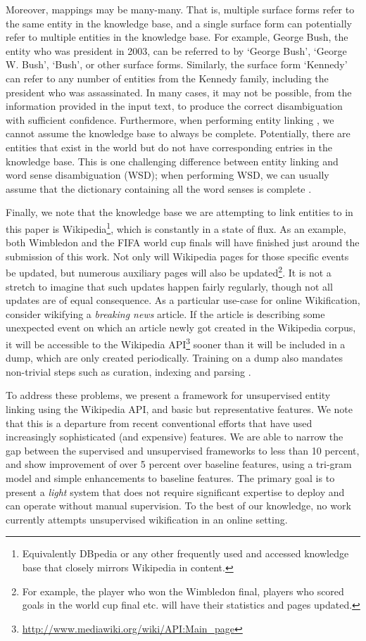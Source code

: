 \documentclass[runningheads,a4paper]{llncs}
\begin{document}
Moreover, mappings may be many-many. 
That is, multiple surface forms refer to the same entity in the knowledge base, and a single
surface form can potentially refer to multiple entities in the knowledge base. For example,
George Bush, the entity who was president in 2003, can be referred to by `George Bush',
`George W. Bush', `Bush', or other surface forms. Similarly, the surface 
form `Kennedy'
can refer to any number of entities from the Kennedy family, including the president 
who was
assassinated. In many cases, it may not be possible, from the information provided in the input text, to produce the correct disambiguation with sufficient confidence. 
Furthermore, when performing entity linking \cite{cucerzan}, we cannot assume the knowledge base to always be complete. Potentially, there are entities that exist in the world but do 
not have corresponding entries in the knowledge base. This is one challenging difference between
entity linking and word sense disambiguation (WSD); when performing WSD, we can usually assume that the dictionary 
containing all the word senses is complete \cite{wsd}.

Finally, we note that the knowledge base we are attempting to link entities to in this paper is Wikipedia\footnote{Equivalently DBpedia or any other frequently used and accessed knowledge base that closely mirrors Wikipedia in content.}, which is constantly in a state of flux. As an example, both Wimbledon and the FIFA world cup finals will have finished just around the submission of this work. Not only will Wikipedia pages for those specific events be updated, but numerous auxiliary pages will also be updated\footnote{For example, the player who won the Wimbledon final, players who scored goals in the world cup final etc. will have their statistics and pages updated.}. It is not a stretch to imagine that such updates happen fairly regularly, though not all updates are of equal consequence. As a particular use-case for online Wikification, consider wikifying a \emph{breaking news} article. If the article is describing some unexpected event on which an article newly got created in the Wikipedia corpus, it will be accessible to the Wikipedia API\footnote{\url{http://www.mediawiki.org/wiki/API:Main_page}} sooner than it will be included in a dump, which are only created periodically. Training on a dump also mandates non-trivial steps such as curation, indexing and parsing \cite{ir}.  

To address these problems, we present a framework for unsupervised entity linking using the Wikipedia API, and basic but representative features. We note that this is a departure from recent conventional efforts that have used increasingly sophisticated (and expensive) features. We are able to narrow the gap between the supervised and unsupervised frameworks to less than 10 percent, and show improvement of over 5 percent over baseline features, using a tri-gram model and simple enhancements to baseline features. The primary goal is to present a \emph{light} system that does not require significant expertise to deploy and can operate without manual supervision. To the best of our knowledge, no work currently attempts unsupervised wikification in an online setting.
\end{document}
